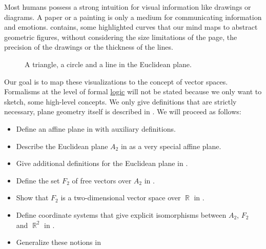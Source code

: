 \begin{remark}\label{rem:affine_coordinate_system_concept}
  Most humans possess a strong intuition for visual information like drawings or diagrams. A paper or a painting is only a medium for communicating information and emotions.  contains, some highlighted curves that our mind maps to abstract geometric figures, without considering the size limitations of the page, the precision of the drawings or the thickness of the lines.

  \begin{figure}[b]
    \centering
    \iffalse\begin{mplibcode}
      u := 1cm;

      beginfig(1);
      draw (0, -1) * u -- (3, 0) * u;
      draw (-1, 2) * u -- (3, 1) * u -- (1, 3) * u -- cycle;
      draw fullcircle scaled 1.5u shifted ((0, 0.5) * u);
      endfig;
    \end{mplibcode}\fi
    \caption{A triangle, a circle and a line in the Euclidean plane.}\label{def:euclidean_plane/figures}
  \end{figure}

  Our goal is to map these visualizations to the concept of vector spaces. Formalisms at the level of formal \hyperref[def:first_order_language]{logic} will not be stated because we only want to sketch, some high-level concepts. We only give definitions that are strictly necessary, plane geometry itself is described in . We will proceed as follows:

  \begin{itemize}
    \item Define an affine plane in  with auxiliary definitions.
    \item Describe the Euclidean plane \( A_2 \) in  as a very special affine plane.
    \item Give additional definitions for the Euclidean plane in .
    \item Define the set \( F_2 \) of free vectors over \( A_2 \) in .
    \item Show that \( F_2 \) is a two-dimensional vector space over \( \BbbR \) in .
    \item Define coordinate systems that give explicit isomorphisms between \( A_2 \), \( F_2 \) and \( \BbbR^2 \) in .
    \item Generalize these notions in 
  \end{itemize}
\end{remark}

